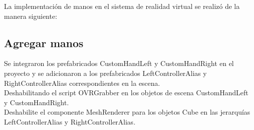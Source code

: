 La implementación de manos en el sistema de realidad virtual se realizó de la manera siguiente:\\

\subsection{Agregar manos}
Se integraron los prefabricados CustomHandLeft y CustomHandRight en el proyecto y se adicionaron a  los prefabricados LeftControllerAlias y RightControllerAlias correspondientes en la escena.\\

Deshabilitando el script OVRGrabber en los objetos de escena CustomHandLeft y CustomHandRight.\\

Deshabilite el componente MeshRenderer para los objetos Cube en las jerarquías LeftControllerAlias y RightControllerAlias.\\

